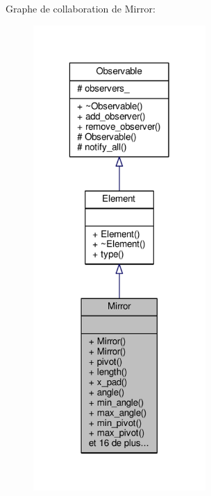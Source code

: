 Graphe de collaboration de Mirror\+:
\nopagebreak
\begin{figure}[H]
\begin{center}
\leavevmode
\includegraphics[width=186pt]{dc/d9b/classMirror__coll__graph}
\end{center}
\end{figure}
